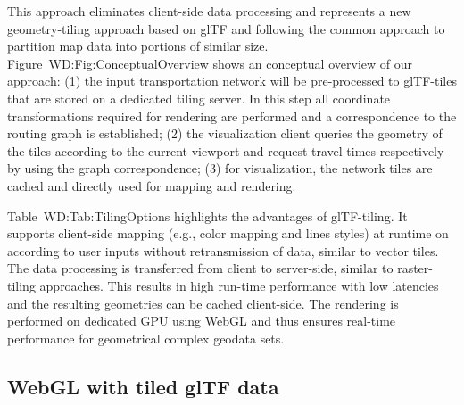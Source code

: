      This approach eliminates client-side data processing and represents a new geometry-tiling
      approach based on glTF and following the common approach to partition map data
      into portions of similar size. Figure~{WD:Fig:ConceptualOverview} shows an conceptual
      overview of our approach: (1) the input transportation network will be pre-processed
      to glTF-tiles that are stored on a dedicated tiling server. In this step all
      coordinate transformations required for rendering are performed and a correspondence
      to the routing graph is established; (2) the visualization client queries the
      geometry of the tiles according to the current viewport and request travel times
      respectively by using the graph correspondence; (3) for visualization, the network
      tiles are cached and directly used for mapping and rendering.\par
      Table~{WD:Tab:TilingOptions} highlights the advantages of glTF-tiling. It
      supports client-side mapping (e.g., color mapping and lines styles) at runtime
      on according to user inputs without retransmission of data, similar to vector
      tiles. The data processing is transferred from client to server-side, similar
      to raster-tiling approaches. This results in high run-time performance with
      low latencies and the resulting geometries can be cached client-side. The
      rendering is performed on dedicated GPU using WebGL and thus ensures real-time
      performance for geometrical complex geodata sets.\par


    \subsection{WebGL with tiled glTF data}
      \label{sec:imple:applc:tgltf}
